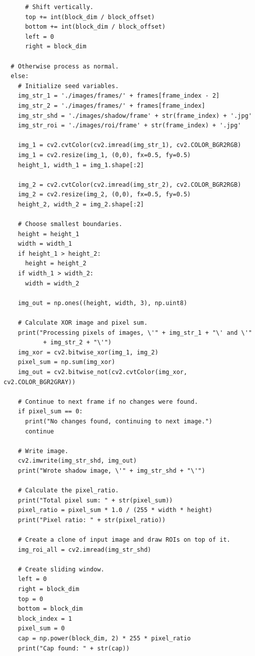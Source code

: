 \documentclass[conference]{IEEEtran}
\begin{document}
\begin{verbatim}
      # Shift vertically.
      top += int(block_dim / block_offset)
      bottom += int(block_dim / block_offset)
      left = 0
      right = block_dim

  # Otherwise process as normal.
  else:
    # Initialize seed variables.
    img_str_1 = './images/frames/' + frames[frame_index - 2]
    img_str_2 = './images/frames/' + frames[frame_index]
    img_str_shd = './images/shadow/frame' + str(frame_index) + '.jpg'
    img_str_roi = './images/roi/frame' + str(frame_index) + '.jpg'

    img_1 = cv2.cvtColor(cv2.imread(img_str_1), cv2.COLOR_BGR2RGB)
    img_1 = cv2.resize(img_1, (0,0), fx=0.5, fy=0.5) 
    height_1, width_1 = img_1.shape[:2]

    img_2 = cv2.cvtColor(cv2.imread(img_str_2), cv2.COLOR_BGR2RGB)
    img_2 = cv2.resize(img_2, (0,0), fx=0.5, fy=0.5) 
    height_2, width_2 = img_2.shape[:2]

    # Choose smallest boundaries.
    height = height_1
    width = width_1
    if height_1 > height_2:
      height = height_2
    if width_1 > width_2:
      width = width_2

    img_out = np.ones((height, width, 3), np.uint8)

    # Calculate XOR image and pixel sum.
    print("Processing pixels of images, \'" + img_str_1 + "\' and \'"
           + img_str_2 + "\'")
    img_xor = cv2.bitwise_xor(img_1, img_2)
    pixel_sum = np.sum(img_xor)
    img_out = cv2.bitwise_not(cv2.cvtColor(img_xor, cv2.COLOR_BGR2GRAY))

    # Continue to next frame if no changes were found.
    if pixel_sum == 0:
      print("No changes found, continuing to next image.")
      continue

    # Write image.
    cv2.imwrite(img_str_shd, img_out)
    print("Wrote shadow image, \'" + img_str_shd + "\'")

    # Calculate the pixel_ratio.
    print("Total pixel sum: " + str(pixel_sum))
    pixel_ratio = pixel_sum * 1.0 / (255 * width * height)
    print("Pixel ratio: " + str(pixel_ratio))

    # Create a clone of input image and draw ROIs on top of it.
    img_roi_all = cv2.imread(img_str_shd)

    # Create sliding window.
    left = 0
    right = block_dim
    top = 0
    bottom = block_dim
    block_index = 1
    pixel_sum = 0
    cap = np.power(block_dim, 2) * 255 * pixel_ratio
    print("Cap found: " + str(cap))


\end{verbatim}
\end{document}
